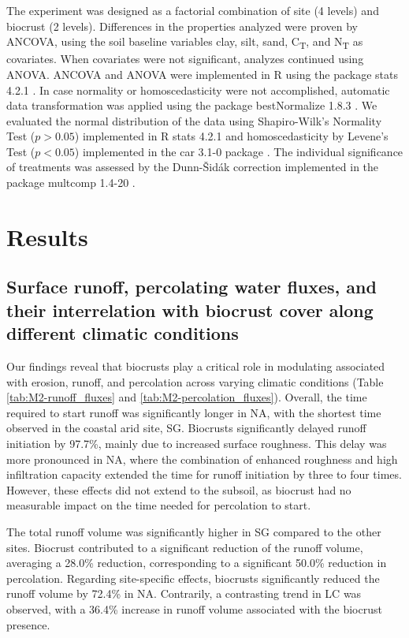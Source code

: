 The experiment was designed as a factorial combination of site (4 levels) and biocrust (2 levels). Differences in the properties analyzed were proven by ANCOVA, using the soil baseline variables clay, silt, sand, C\textsubscript{T}, and N\textsubscript{T} as covariates. When covariates were not significant, analyzes continued using ANOVA. ANCOVA and ANOVA were implemented in R using the package stats 4.2.1 \citep{RCoreTeam2022}. In case normality or homoscedasticity were not accomplished, automatic data transformation was applied using the package bestNormalize 1.8.3 \citep{Peterson2021,Peterson2020}. We evaluated the normal distribution of the data using Shapiro-Wilk's Normality Test ($p> 0.05$) implemented in R stats 4.2.1 \citep{RCoreTeam2022} and homoscedasticity by Levene's Test ($p<0.05$) implemented in the car 3.1-0 package \citep{Fox2018}. The individual significance of treatments was assessed by the Dunn-Šidák correction implemented in the package multcomp 1.4-20 \citep{Hothorn2008}.

\section{Results}
\subsection{Surface runoff, percolating water fluxes, and their interrelation with biocrust cover along different climatic conditions}

Our findings reveal that biocrusts play a critical role in modulating associated with erosion, runoff, and percolation across varying climatic conditions (Table \ref{tab:M2-runoff_fluxes} and \ref{tab:M2-percolation_fluxes}). Overall, the time required to start runoff was significantly longer in NA, with the shortest time observed in the coastal arid site, SG. Biocrusts significantly delayed runoff initiation by 97.7\%, mainly due to increased surface roughness. This delay was more pronounced in NA, where the combination of enhanced roughness and high infiltration capacity extended the time for runoff initiation by three to four times. However, these effects did not extend to the subsoil, as biocrust had no measurable impact on the time needed for percolation to start.

The total runoff volume was significantly higher in SG compared to the other sites. Biocrust contributed to a significant reduction of the runoff volume, averaging a 28.0\% reduction, corresponding to a significant 50.0\% reduction in percolation. Regarding site-specific effects, biocrusts significantly reduced the runoff volume by 72.4\% in NA. Contrarily, a contrasting trend in LC was observed, with a 36.4\% increase in runoff volume associated with the biocrust presence.

